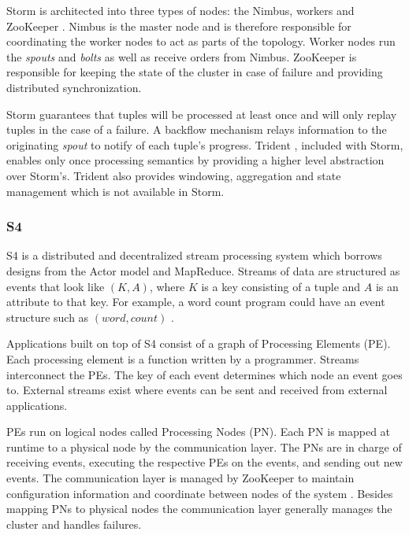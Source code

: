 \documentclass[12pt]{article}
\begin{document}
Storm is architected into three types of nodes: the Nimbus, workers and ZooKeeper \cite{zookeeper}. Nimbus is the master node and is therefore responsible for coordinating the worker nodes to act as parts of the topology. Worker nodes run the \textit{spouts} and \textit{bolts} as well as receive orders from Nimbus. ZooKeeper is responsible for keeping the state of the cluster in case of failure and providing distributed synchronization.

Storm guarantees that tuples will be processed at least once and will only replay tuples in the case of a failure. A backflow mechanism relays information to the originating \textit{spout} to notify of each tuple's progress. Trident \cite{toshniwal2014storm}, included with Storm, enables only once processing semantics by providing a higher level abstraction over Storm's. Trident also provides windowing, aggregation and state management which is not available in Storm.



\subsubsection{S4}

S4 \cite{neumeyer2010s4} is a distributed and decentralized stream processing system which borrows designs from the Actor model and MapReduce. Streams of data are structured as events that look like $(K, A)$, where $K$ is a key consisting of a tuple and $A$ is an attribute to that key. For example, a word count program could have an event structure such as $(word, count)$ \cite{zhang2016survey}.

Applications built on top of S4 consist of a graph of Processing Elements (PE). Each processing element is a function written by a programmer. Streams interconnect the PEs. The key of each event determines which node an event goes to. External streams exist where events can be sent and received from external applications.

PEs run on logical nodes called Processing Nodes (PN). Each PN is mapped at runtime to a physical node by the communication layer. The PNs are in charge of receiving events, executing the respective PEs on the events, and sending out new events. The communication layer is managed by ZooKeeper \cite{zookeeper} to maintain configuration information and coordinate between nodes of the system \cite{neumeyer2010s4}. Besides mapping PNs to physical nodes the communication layer generally manages the cluster and handles failures.
\end{document}
